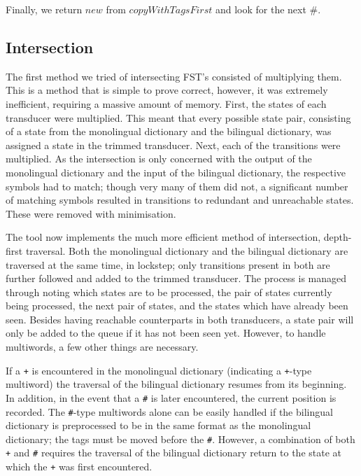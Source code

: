 \documentclass[10pt, a4paper]{article}
\newcommand{\ana}[1]{\texttt{#1}}
\begin{document}
Finally, we return $new$ from $copyWithTagsFirst$ and look for the
next \#.

\subsection{Intersection}


The first method we tried of intersecting FST's consisted of
multiplying them.  This is a method that is simple to prove correct,
however, it was extremely inefficient, requiring a massive amount of
memory.  First, the states of each transducer were multiplied.  This
meant that every possible state pair, consisting of a state from the
monolingual dictionary and the bilingual dictionary, was assigned a
state in the trimmed transducer.  Next, each of the transitions were
multiplied.  As the intersection is only concerned with the output of
the monolingual dictionary and the input of the bilingual dictionary,
the respective symbols had to match; though very many of them did not,
a significant number of matching symbols resulted in transitions to
redundant and unreachable states.  These were removed with
minimisation.

The tool now implements the much more efficient method of
intersection, depth-first traversal.  Both the monolingual dictionary
and the bilingual dictionary are traversed at the same time, in
lockstep; only transitions present in both are further followed and
added to the trimmed transducer.  The process is managed through
noting which states are to be processed, the pair of states currently
being processed, the next pair of states, and the states which have
already been seen.  Besides having reachable counterparts in both
transducers, a state pair will only be added to the queue if it has
not been seen yet.  However, to handle multiwords, a few other things
are necessary.

If a \ana{+} is encountered in the monolingual dictionary (indicating
a \ana{+}-type multiword) the traversal of the bilingual dictionary
resumes from its beginning. In addition, in the event that a \ana{\#}
is later encountered, the current position is recorded. The
\ana{\#}-type multiwords alone can be easily handled if the bilingual
dictionary is preprocessed to be in the same format as the monolingual
dictionary; the tags must be moved before the \ana{\#}.  However, a
combination of both \ana{+} and \ana{\#} requires the traversal of the
bilingual dictionary return to the state at which the \ana{+} was
first encountered.
\end{document}
